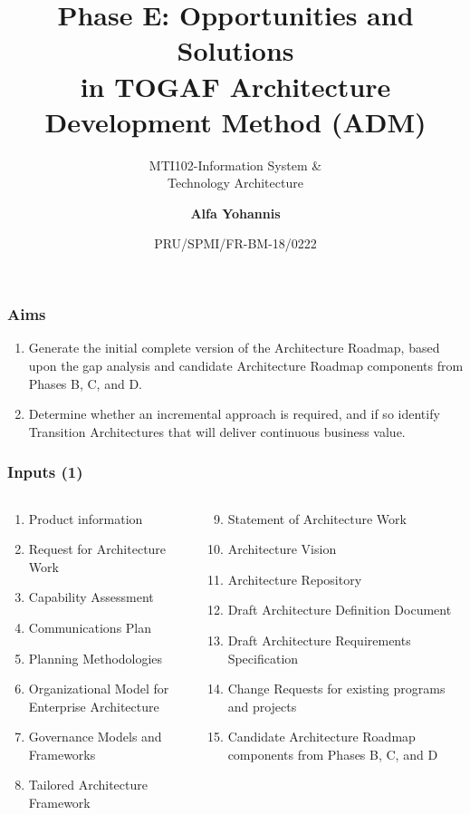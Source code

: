 \documentclass[aspectratio=169, table]{beamer}
\subtitle{MTI102-Information System \&\\Technology Architecture}
\title{\vskip-0.7cm \Large Phase E: Opportunities and Solutions\\in TOGAF
	Architecture\\Development Method (ADM)}
\date[Serial]{\scriptsize {PRU/SPMI/FR-BM-18/0222}}
\author[Pradita]{\small {\textbf{Alfa Yohannis}}}
\begin{document}
	
	\frame{\titlepage}
	
	\begin{frame}
		\frametitle{Aims}
		\begin{enumerate}
			\item Generate the initial complete version of the Architecture Roadmap, based upon the gap analysis and candidate Architecture Roadmap components from Phases B, C, and D.
			\item Determine whether an incremental approach is required, and if so identify Transition Architectures that will deliver continuous business value.
		\end{enumerate}
		
	\end{frame}
	
	\begin{frame}
		\frametitle{Inputs (1)}
		\vspace{20pt}
		\begin{columns}[onlytextwidth]
			\begin{column}{0.45\textwidth}
				\begin{enumerate}
					\item Product information
					\item Request for Architecture Work
					\item Capability Assessment
					\item Communications Plan
					\item Planning Methodologies
					\item Organizational Model for Enterprise Architecture
					\item Governance Models and Frameworks
					\item Tailored Architecture Framework
				\end{enumerate}
				
			\end{column}
			\begin{column}{0.55\textwidth}
				\begin{enumerate}
					\setcounter{enumi}{8}
					\item Statement of Architecture Work
					\item Architecture Vision
					\item Architecture Repository
					\item Draft Architecture Definition Document
					\item Draft Architecture Requirements Specification
					\item Change Requests for existing programs and projects
					\item Candidate Architecture Roadmap components from Phases B, C, and D
				\end{enumerate}
			\end{column}
		\end{columns}
	\end{frame}
	
\end{document}
